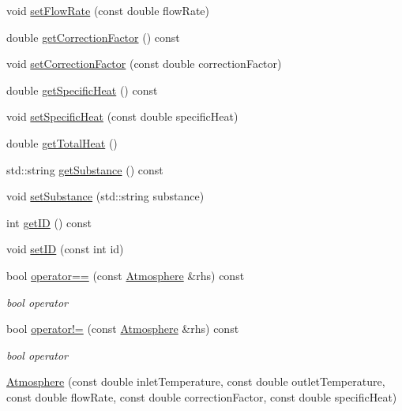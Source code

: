 \begin{DoxyCompactItemize}
\item 
void \hyperlink{class_atmosphere_a9ff0b718c810aec0bb101336db69fd22}{set\+Flow\+Rate} (const double flow\+Rate)
\item 
double \hyperlink{class_atmosphere_a79c94343c7b6659b2f79688a1ba69aed}{get\+Correction\+Factor} () const
\item 
void \hyperlink{class_atmosphere_a86fab4b05de35c9a2b1a3a7e5ab70779}{set\+Correction\+Factor} (const double correction\+Factor)
\item 
double \hyperlink{class_atmosphere_a59802a10861a58ab0f0f4e0ab8671e14}{get\+Specific\+Heat} () const
\item 
void \hyperlink{class_atmosphere_a17450de3bc7a64b2736b1fe8785410cd}{set\+Specific\+Heat} (const double specific\+Heat)
\item 
double \hyperlink{class_atmosphere_ad3dd28020262aee76d374cbfb7998e46}{get\+Total\+Heat} ()
\item 
std\+::string \hyperlink{class_atmosphere_a3ac0fb0d4fc92edc690e44b40b7018c2}{get\+Substance} () const
\item 
void \hyperlink{class_atmosphere_aa92f55a1f07304f3e57fdfb8ece65d82}{set\+Substance} (std\+::string substance)
\item 
int \hyperlink{class_atmosphere_a73b921f4d29a4a409488cbdb56c53ff7}{get\+ID} () const
\item 
void \hyperlink{class_atmosphere_a4698bf2580f7c24c8e0617d6455bfcac}{set\+ID} (const int id)
\item 
\mbox{\label{class_atmosphere_a6bddf411a91af4808f52cd69033a5c54}} 
bool \hyperlink{class_atmosphere_a6bddf411a91af4808f52cd69033a5c54}{operator==} (const \hyperlink{class_atmosphere}{Atmosphere} \&rhs) const
\begin{DoxyCompactList}\small\item\em bool operator \end{DoxyCompactList}\item 
\mbox{\label{class_atmosphere_a8f75154e49eb74561dc9053607f502f9}} 
bool \hyperlink{class_atmosphere_a8f75154e49eb74561dc9053607f502f9}{operator!=} (const \hyperlink{class_atmosphere}{Atmosphere} \&rhs) const
\begin{DoxyCompactList}\small\item\em bool operator \end{DoxyCompactList}\item 
\hyperlink{class_atmosphere_adbd727cfc7682d3b3b72a4fb101531f1}{Atmosphere} (const double inlet\+Temperature, const double outlet\+Temperature, const double flow\+Rate, const double correction\+Factor, const double specific\+Heat)

\end{DoxyCompactItemize}

